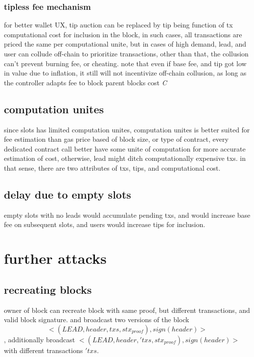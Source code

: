 \documentclass[a4paper]{article}
\begin{document}
 \subsubsection {tipless fee mechanism}
for better wallet UX, tip auction can be replaced by tip being function of tx computational cost for inclusion in the block, in such cases, all transactions are priced the same per computational unite, but in cases of high demand, lead, and user can collude off-chain to prioritize transactions, other than that, the collusion can't prevent burning fee, or cheating.
note that even if base fee, and tip got low in value due to inflation, it still will not incentivize off-chain collusion, as long as the controller adapts fee to block parent blocks cost \emph{C}

\subsection{ computation unites}
since slots has limited computation unites, computation unites is better suited for fee estimation than gas price based of block size, or type of contract, every dedicated contract call better have some unite of computation for more accurate estimation of cost, otherwise, lead might ditch computationally expensive txs. in that sense, there are two attributes of txs, tips, and computational cost.

\subsection{ delay due to empty slots}
 empty slots with no leads would accumulate pending txs, and would increase base fee on subsequent slots, and users would increase tips for inclusion.

\section { further attacks }

\subsection {recreating blocks}
\item owner of block can recreate block with same proof, but different transactions, and valid block signature. and broadcast two versions of the block
  $$<(LEAD, header, txs, stx_{proof}), sign(header)>$$, additionally broadcast  $<(LEAD, header, \prime{txs}, stx_{proof}), sign(header)>$ with different transactions $\prime{txs}$.
\end{document}
